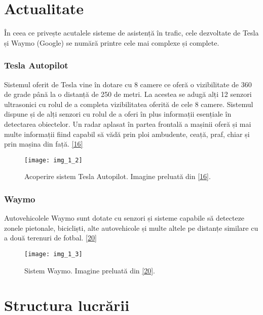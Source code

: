 \section{Actualitate}

În ceea ce privește acutalele sisteme de asistență în trafic, cele dezvoltate de Tesla și Waymo (Google) se numără printre cele mai complexe și complete.

\subsubsection{Tesla Autopilot}

Sistemul oferit de Tesla vine în dotare cu 8 camere ce oferă o vizibilitate de 360 de grade până la o distanță de 250 de metri. La acestea se adugă alți 12 senzori ultrasonici cu rolul de a completa vizibilitatea oferită de cele 8 camere. Sistemul dispune și de alți senzori cu rolul de a oferi în plus informații esențiale în detectarea obiectelor. Un radar aplasat în partea frontală a mașinii oferă și mai multe informații fiind capabil să vădă prin ploi ambudente, ceață, praf, chiar și prin mașina din față. \hyperlink{TeslaAutopilotSystem}{[16]}

\begin{figure}[!h]
	\centering
	\texttt{[image: img\_1\_2]}
	\caption[Acoperire sistem Tesla Autopilot]{Acoperire sistem Tesla Autopilot. Imagine preluată din \hyperlink{TeslaAutopilotSystem}{[16]}.}
\end{figure} 

\subsubsection{Waymo}

Autovehicolele Waymo sunt dotate cu senzori și sisteme capabile să detecteze zonele pietonale, bicicliști, alte autovehicole și multe altele pe distanțe similare cu a două terenuri de fotbal. \hyperlink{WaymoSystem}{[20]}

\begin{figure}[!h]
	\centering
	\texttt{[image: img\_1\_3]}
	\caption[Sistem Waymo]{Sistem Waymo. Imagine preluată din \hyperlink{WaymoSystem}{[20]}.}
\end{figure} 

\section{Structura lucrării}

